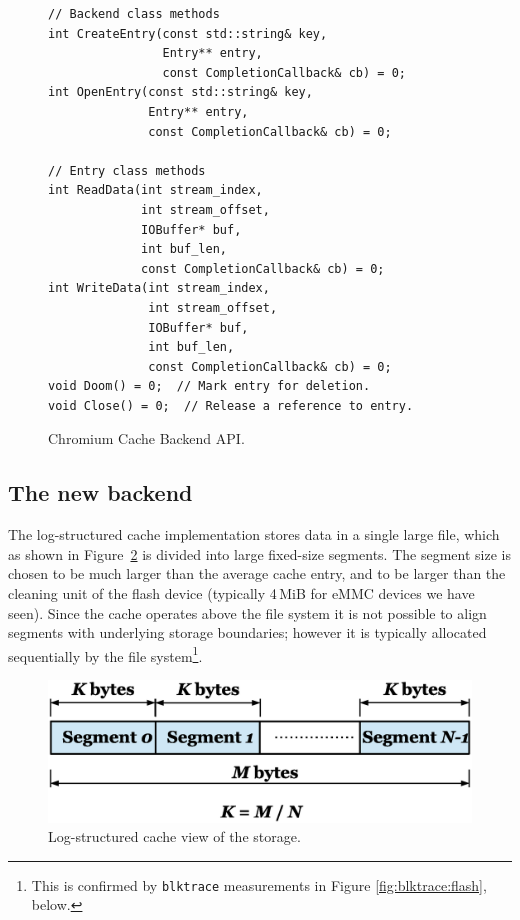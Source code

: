 \documentclass[letterpaper,twocolumn,10pt]{article}
\begin{document}
\begin{figure}[h]
{\small
\begin{verbatim}
// Backend class methods
int CreateEntry(const std::string& key,
                Entry** entry,
                const CompletionCallback& cb) = 0;
int OpenEntry(const std::string& key,
              Entry** entry,
              const CompletionCallback& cb) = 0;

// Entry class methods
int ReadData(int stream_index,
             int stream_offset,
             IOBuffer* buf,
             int buf_len,
             const CompletionCallback& cb) = 0;
int WriteData(int stream_index,
              int stream_offset,
              IOBuffer* buf,
              int buf_len,
              const CompletionCallback& cb) = 0;
void Doom() = 0;  // Mark entry for deletion.
void Close() = 0;  // Release a reference to entry.
\end{verbatim}
}
\caption{Chromium Cache Backend API.}
\label{cache-api}
\end{figure}

\subsection{The new backend}

The log-structured cache implementation stores data in a single large file,
which as shown in Figure~\ref{fig:storage} is divided into large
fixed-size segments.  The segment size is chosen to be much larger than the average cache
entry, and to be larger than the cleaning unit of the flash device (typically
4\,MiB for eMMC devices we have seen).  Since the cache operates above the file
system it is not possible to align segments with underlying storage boundaries;
however it is typically allocated sequentially by the file
system\footnote{This is confirmed by \texttt{blktrace} measurements in
  Figure \ref{fig:blktrace:flash}, below.}.

\begin{figure}[t]
  \begin{center}
    \includegraphics[width=\columnwidth]{graphs/storage}
  \end{center}
  \caption{Log-structured cache view of the storage.}
  \label{fig:storage} 
\end{figure}
\end{document}
